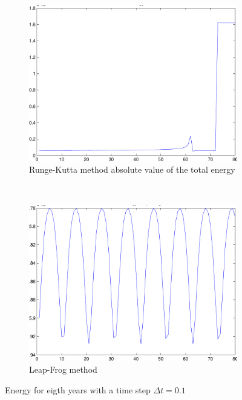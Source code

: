 \documentclass[a4paper,12pt, english]{article}
\begin{document}
\begin{figure}
        \centering
        \begin{subfigure}[b]{0.8\textwidth}
                \includegraphics[width=\textwidth]{main_totE_rk4_dt_0_1.pdf}
                \caption{Runge-Kutta method absolute value of the total energy}
                \label{fig:RK4_dt_0.1}
        \end{subfigure}%
        ~ %
        \begin{subfigure}[b]{0.8\textwidth}
                \includegraphics[width=\textwidth]{totE_main_lf_dt_0_1.pdf}
                \caption{Leap-Frog method}
                \label{fig:LF_dt_0.1}
        \end{subfigure}
        \caption{Energy for eigth years with a time step $\Delta t = 0.1$}
    
\end{figure}
\end{document}
